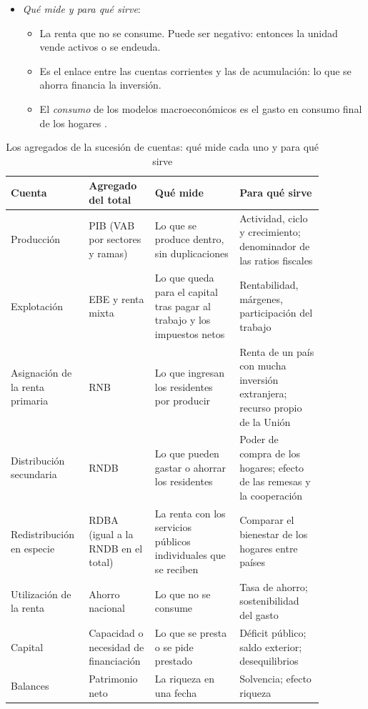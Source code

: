 \documentclass[11pt]{article}
\begin{document}
\begin{itemize}
\begin{itemize}
  \end{itemize}
\item \emph{Qué mide y para qué sirve}:
  \begin{itemize}
  \item La renta que no se consume. Puede ser negativo: entonces la unidad vende activos o se endeuda.
  \item Es el enlace entre las cuentas corrientes y las de acumulación: lo que se ahorra financia la inversión.
  \item El \emph{consumo} de los modelos macroeconómicos es el gasto en consumo final de los hogares .
  \end{itemize}
\end{itemize}

\begin{table}[H]
\centering
\caption{Los agregados de la sucesión de cuentas: qué mide cada uno y para qué sirve}\label{tab:agregados}
\renewcommand{\arraystretch}{1.2}
\small
\begin{tabular}{>{\raggedright\arraybackslash}m{0.18\linewidth}>{\raggedright\arraybackslash}m{0.18\linewidth}>{\raggedright\arraybackslash}m{0.255\linewidth}>{\raggedright\arraybackslash}m{0.255\linewidth}}
\toprule
\rowcolor{tceeazulpalido}
\textbf{Cuenta} & \textbf{Agregado del total} & \textbf{Qué mide} & \textbf{Para qué sirve} \\
\midrule
Producción & PIB (VAB por sectores y ramas) & Lo que se produce dentro, sin duplicaciones & Actividad, ciclo y crecimiento; denominador de las ratios fiscales \\
Explotación & EBE y renta mixta & Lo que queda para el capital tras pagar al trabajo y los impuestos netos & Rentabilidad, márgenes, participación del trabajo \\
Asignación de la renta primaria & RNB & Lo que ingresan los residentes por producir & Renta de un país con mucha inversión extranjera; recurso propio de la Unión \\
Distribución secundaria & RNDB & Lo que pueden gastar o ahorrar los residentes & Poder de compra de los hogares; efecto de las remesas y la cooperación \\
Redistribución en especie & RDBA (igual a la RNDB en el total) & La renta con los servicios públicos individuales que se reciben & Comparar el bienestar de los hogares entre países \\
Utilización de la renta & Ahorro nacional & Lo que no se consume & Tasa de ahorro; sostenibilidad del gasto \\
Capital & Capacidad o necesidad de financiación & Lo que se presta o se pide prestado & Déficit público; saldo exterior; desequilibrios \\
Balances & Patrimonio neto & La riqueza en una fecha & Solvencia; efecto riqueza \\
\bottomrule
\end{tabular}
\end{table}
\end{document}
